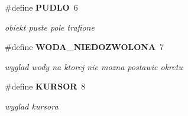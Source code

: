 \begin{DoxyCompactItemize}
\#define \textbf{ P\+U\+D\+LO}~6
\begin{DoxyCompactList}\small\item\em obiekt puste pole trafione \end{DoxyCompactList}\item 
\#define \textbf{ W\+O\+D\+A\+\_\+\+N\+I\+E\+D\+O\+Z\+W\+O\+L\+O\+NA}~7
\begin{DoxyCompactList}\small\item\em wyglad wody na ktorej nie mozna postawic okretu \end{DoxyCompactList}\item 
\#define \textbf{ K\+U\+R\+S\+OR}~8
\begin{DoxyCompactList}\small\item\em wyglad kursora \end{DoxyCompactList}\end{DoxyCompactItemize}
